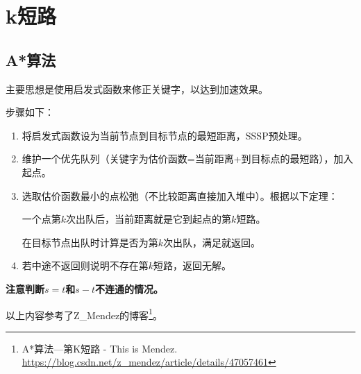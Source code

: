 \section{k短路}
\subsection{A*算法}
主要思想是使用启发式函数来修正关键字，以达到加速效果。

步骤如下：

\begin{enumerate}
	\item 将启发式函数设为当前节点到目标节点的最短距离，SSSP预处理。
	\item 维护一个优先队列（关键字为估价函数=当前距离+到目标点的最短路），加入起点。
	\item 选取估价函数最小的点松弛（不比较距离直接加入堆中）。根据以下定理：
	      \begin{theorem}
		      一个点第$k$次出队后，当前距离就是它到起点的第$k$短路。
	      \end{theorem}
	      在目标节点出队时计算是否为第$k$次出队，满足就返回。
	\item 若中途不返回则说明不存在第$k$短路，返回无解。
\end{enumerate}
{\bfseries 注意判断$s=t$和$s-t$不连通的情况。}

以上内容参考了Z\_Mendez的博客\footnote{A*算法—第K短路 - This is Mendez.
	\url{https://blog.csdn.net/z\_mendez/article/details/47057461}
}。
